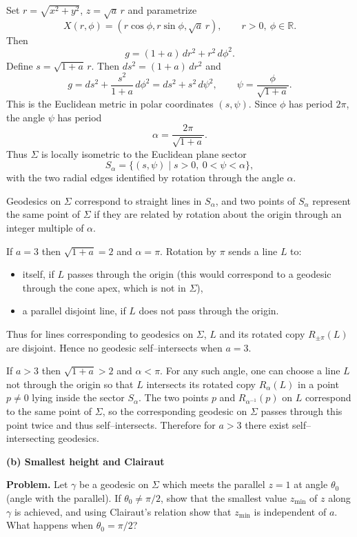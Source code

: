\begin{solution}
Set $r=\sqrt{x^2+y^2}$, $z=\sqrt{a}\,r$ and parametrize
\[
X(r,\phi) = (r\cos\phi,r\sin\phi,\sqrt{a}\,r),\qquad r>0,\ \phi\in\mathbb R.
\]
Then
\[
g = (1+a)\,dr^2 + r^2\,d\phi^2.
\]
Define $s=\sqrt{1+a}\,r$. Then $ds^2=(1+a)\,dr^2$ and
\[
g = ds^2 + \frac{s^2}{1+a}\,d\phi^2
= ds^2 + s^2\,d\psi^2,\qquad \psi=\frac{\phi}{\sqrt{1+a}}.
\]
This is the Euclidean metric in polar coordinates $(s,\psi)$.
Since $\phi$ has period $2\pi$, the angle $\psi$ has period
\[
\alpha = \frac{2\pi}{\sqrt{1+a}}.
\]
Thus $\Sigma$ is locally isometric to the Euclidean plane sector
\[
S_\alpha = \{(s,\psi) \mid s>0,\ 0<\psi<\alpha\},
\]
with the two radial edges identified by rotation through the angle $\alpha$.

Geodesics on $\Sigma$ correspond to straight lines in $S_\alpha$,
and two points of $S_\alpha$ represent the same point of $\Sigma$
if they are related by rotation about the origin through an integer
multiple of $\alpha$.

If $a=3$ then $\sqrt{1+a}=2$ and $\alpha=\pi$. Rotation by $\pi$ sends a
line $L$ to:
\begin{itemize}
	\item itself, if $L$ passes through the origin (this would correspond to
	a geodesic through the cone apex, which is not in $\Sigma$),
	\item a parallel disjoint line, if $L$ does not pass through the origin.
\end{itemize}
Thus for lines corresponding to geodesics on $\Sigma$, $L$ and its rotated
copy $R_{\pm\pi}(L)$ are disjoint. Hence no geodesic self--intersects when
$a=3$.

If $a>3$ then $\sqrt{1+a}>2$ and $\alpha<\pi$. For any such angle, one can
choose a line $L$ not through the origin so that $L$ intersects its rotated
copy $R_{\alpha}(L)$ in a point $p\neq0$ lying inside the sector $S_\alpha$.
The two points $p$ and $R_{\alpha^{-1}}(p)$ on $L$ correspond to the same
point of $\Sigma$, so the corresponding geodesic on $\Sigma$ passes through
this point twice and thus self--intersects. Therefore for $a>3$ there exist
self--intersecting geodesics.

\par\medskip\noindent\textbf{(b) Smallest height and Clairaut}\par\smallskip


\textbf{Problem.}
Let $\gamma$ be a geodesic on $\Sigma$ which meets the parallel $z=1$
at angle $\theta_0$ (angle with the parallel). If $\theta_0\neq\pi/2$,
show that the smallest value $z_{\min}$ of $z$ along $\gamma$ is achieved,
and using Clairaut's relation show that $z_{\min}$ is independent of $a$.
What happens when $\theta_0=\pi/2$?


\end{solution}
